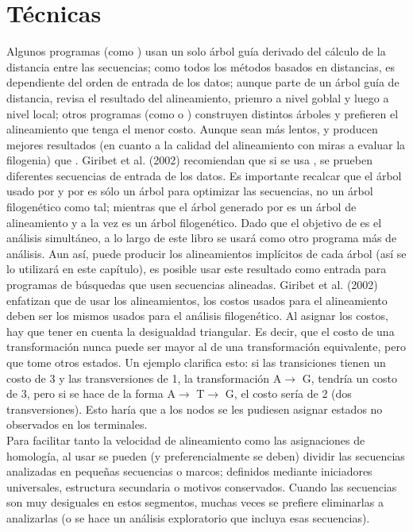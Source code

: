 \section{T\'ecnicas}
Algunos programas (como ) usan un solo \'arbol gu\'ia derivado del c\'alculo de la distancia entre las 
secuencias; como todos los m\'etodos basados en distancias, es dependiente del orden de entrada de los datos;  aunque parte de un \'arbol gu\'ia de  distancia, revisa el resultado del alineamiento, priemro a nivel goblal y luego a nivel local; otros 
programas (como  o ) construyen distintos \'arboles y prefieren el alineamiento que tenga el menor 
costo. Aunque sean m\'as lentos,  y  producen mejores resultados (en cuanto a la calidad del 
alineamiento con miras a evaluar la filogenia) que . Giribet et al. (2002) recomiendan que si se usa 
, se prueben diferentes secuencias de entrada de los datos. Es importante recalcar que el \'arbol usado por 
 y por  es s\'olo un \'arbol para optimizar las secuencias, no un \'arbol filogen\'etico como tal; 
mientras que el \'arbol generado por  es un \'arbol de alineamiento y a la vez es un \'arbol filogen\'etico. Dado que el objetivo de  es el an\'alisis simult\'aneo, a lo largo de este libro se usar\'a  como otro programa m\'as de an\'alisis. Aun as\'i,  puede producir los alineamientos impl\'icitos de cada \'arbol (as\'i se lo utilizar\'a en este cap\'itulo), es posible usar este resultado como entrada para programas de b\'usquedas que usen secuencias alineadas. Giribet 
et al. (2002) enfatizan que de usar los alineamientos, los costos usados para el alineamiento deben ser los mismos usados 
para el an\'alisis filogen\'etico. Al asignar los costos, hay que tener en cuenta la desigualdad triangular. Es decir, que el 
costo de una transformaci\'on nunca puede ser mayor al de una transformaci\'on equivalente, pero que tome otros estados. 
Un ejemplo clarifica esto: si las transiciones tienen un costo de 3 y las transversiones de 1, la transformaci\'on 
A$\rightarrow$ G, tendr\'ia un costo de 3, pero si se hace de la forma A$\rightarrow$ T$\rightarrow$ G, el costo ser\'ia de 
2 (dos transversiones). Esto har\'ia que a los nodos se les pudiesen asignar estados no observados en los terminales.\\
Para facilitar tanto la velocidad de alineamiento como las asignaciones de homolog\'ia, al usar  se pueden 
(y preferencialmente se deben) dividir las secuencias analizadas en peque\~nas secuencias o marcos; definidos mediante 
iniciadores universales, estructura secundaria o motivos conservados. Cuando las secuencias son muy desiguales en estos 
segmentos, muchas veces se prefiere eliminarlas a analizarlas (o se hace un an\'alisis exploratorio que incluya esas 
secuencias).
